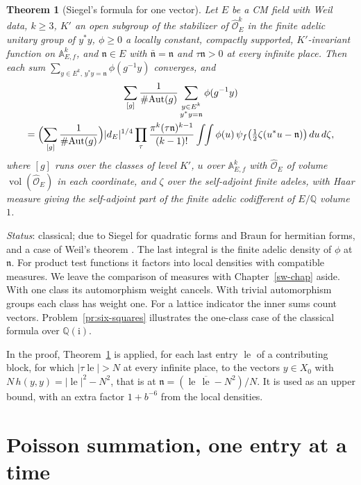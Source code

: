 \documentclass[reqno]{amsart}
\newcounter{chap}
\theoremstyle{definition}
\theoremstyle{plain}
\newtheorem{theorem}{Theorem}[section]
\theoremstyle{remark}
\newcommand{\Q}{\mathbb{Q}}
\newcommand{\A}{\mathbb{A}}
\newcommand{\ii}{\mathrm{i}}
\newcommand{\Oh}{\hat{\mathcal O}_E}
\newcommand{\lE}{\operatorname{le}}
\newcommand{\vol}{\operatorname{vol}}
\begin{document}
\begin{theorem}[Siegel's formula for one vector]\label{thm:siegel}
Let \(E\) be a CM field with Weil data, \(k\ge3\), \(K'\) an open subgroup of the stabilizer of \(\Oh^k\) in the finite adelic unitary group of \(y^*y\), \(\phi\ge0\) a locally constant, compactly supported, \(K'\)-invariant function on \(\A_{E,f}^k\), and \(\mathfrak n\in E\) with \(\bar{\mathfrak n}=\mathfrak n\) and \(\tau\mathfrak n>0\) at every infinite place.  Then each sum \(\sum_{y\in E^k,\,y^*y=\mathfrak n}\phi(g^{-1}y)\) converges, and
\begin{multline*}
 \sum_{[g]}\frac{1}{\#\mathrm{Aut}(g)}\sum_{\substack{y\in E^k\\ y^*y=\mathfrak n}}\phi(g^{-1}y)\\
 =\Bigl(\sum_{[g]}\frac{1}{\#\mathrm{Aut}(g)}\Bigr)\lvert d_E\rvert^{1/4}\prod_\tau\frac{\pi^k(\tau\mathfrak n)^{k-1}}{(k-1)!}
 \int\!\!\int\phi(u)\,\psi_f\bigl(\tfrac12\zeta(u^*u-\mathfrak n)\bigr)\,du\,d\zeta ,
\end{multline*}
where \([g]\) runs over the classes of level \(K'\), \(u\) over \(\A_{E,f}^k\) with \(\Oh\) of volume \(\vol(\Oh)\) in each coordinate, and \(\zeta\) over the self-adjoint finite adeles, with Haar measure giving the self-adjoint part of the finite adelic codifferent of \(E/\Q\) volume \(1\).
\end{theorem}

\noindent\emph{Status}: classical; due to Siegel \cite{Si} for quadratic forms and Braun \cite{Br} for hermitian forms, and a case of Weil's theorem \cite[Thm.~5]{We65}.  The last integral is the finite adelic density of \(\phi\) at \(\mathfrak n\).  For product test functions it factors into local densities with compatible measures.  We leave the comparison of measures with Chapter~\ref{sw-chap} aside.  With one class its automorphism weight cancels.  With trivial automorphism groups each class has weight one.  For a lattice indicator the inner sums count vectors.  Problem~\ref{pr:six-squares} illustrates the one-class case of the classical formula over \(\Q(\ii)\).

In the proof, Theorem~\ref{thm:siegel} is applied, for each last entry \(\lE\) of a contributing block, for which \(\lvert\tau\lE\rvert>N\) at every infinite place, to the vectors \(y\in X_0\) with \(N\,h(y,y)=\lvert\lE\rvert^2-N^2\), that is at \(\mathfrak n=(\lE\,\overline{\lE}-N^2)/N\).  It is used as an upper bound, with an extra factor \(1+b^{-6}\) from the local densities.

\section{Poisson summation, one entry at a time}\label{sec:poisson}
\end{document}
